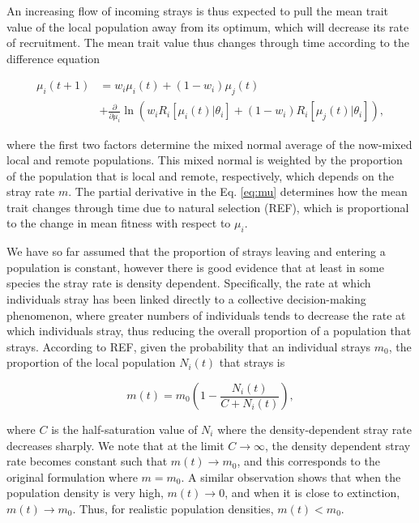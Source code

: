 \documentclass[twocolumn,preprintnumbers,amsmath,amssymb,superscriptaddress]{revtex4}
\begin{document}
An increasing flow of incoming strays is thus expected to pull the mean trait value of the local population away from its optimum, which will decrease its rate of recruitment.
The mean trait value thus changes through time according to the difference equation

\begin{align}
  \mu_i(t+1) &= w_i\mu_i(t) + (1-w_i)\mu_j(t) \\ \nonumber
  &+ \frac{\partial}{\partial \mu_i}\ln\left(w_i R_i[\mu_i(t)|\theta_i] + (1-w_i)R_i[\mu_j(t)|\theta_i]  \right),
  \label{eq:mu}
\end{align}

\noindent where the first two factors determine the mixed normal average of the now-mixed local and remote populations.
This mixed normal is weighted by the proportion of the population that is local and remote, respectively, which depends on the stray rate $m$.
The partial derivative in the Eq. \ref{eq:mu} determines how the mean trait changes through time due to natural selection (REF), which is proportional to the change in mean fitness with respect to $\mu_i$.




We have so far assumed that the proportion of strays leaving and entering a population is constant, however there is good evidence that at least in some species the stray rate is density dependent.
Specifically, the rate at which individuals stray has been linked directly to a collective decision-making phenomenon, where greater numbers of individuals tends to decrease the rate at which individuals stray, thus reducing the overall proportion of a population that strays.
According to REF, given the probability that an individual strays $m_0$, the proportion of the local population $N_i(t)$ that strays is

\begin{equation}
  m(t) = m_0\left(1- \frac{N_i(t)}{C+N_i(t)}\right),
  \label{eq:ddm}
\end{equation}

\noindent where $C$ is the half-saturation value of $N_i$ where the density-dependent stray rate decreases sharply.
We note that at the limit $C\rightarrow \infty$, the density dependent stray rate becomes constant such that $m(t) \rightarrow m_0$, and this corresponds to the original formulation where $m=m_0$.
A similar observation shows that when the population density is very high, $m(t) \rightarrow 0$, and when it is close to extinction, $m(t) \rightarrow m_0$.
Thus, for realistic population densities, $m(t) < m_0$.
\end{document}
